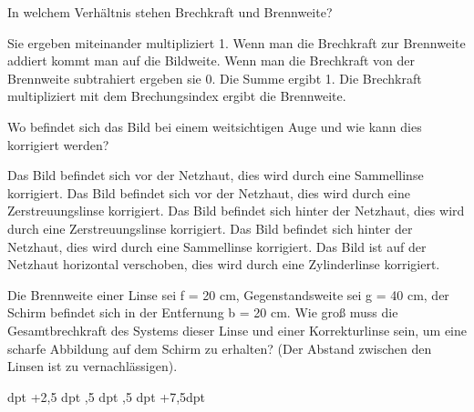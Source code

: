 \documentclass[11pt]{exam}
\begin{document}
\setlength{\voffset}{-0.5in}
\setlength{\headsep}{5pt}

\hspace{2mm}
 \hspace{5mm}
\vspace{4mm}

\begin{questions}

\question In welchem Verhältnis stehen Brechkraft und Brennweite?

\begin{choices}
	\choice Sie ergeben miteinander multipliziert 1.
	\choice Wenn man die Brechkraft zur Brennweite addiert kommt man auf die Bildweite.
	\choice Wenn man die Brechkraft von der Brennweite subtrahiert ergeben sie 0.
	\choice Die Summe ergibt 1.
	\choice Die Brechkraft multipliziert mit dem Brechungsindex ergibt die Brennweite.
\end{choices}

\vspace{3mm}\question Wo befindet sich das Bild bei einem weitsichtigen Auge und wie kann dies korrigiert werden?

\begin{choices}
	\choice Das Bild befindet sich vor der Netzhaut, dies wird durch eine Sammellinse korrigiert.
	\choice Das Bild befindet sich vor der Netzhaut, dies wird durch eine Zerstreuungslinse korrigiert.
	\choice Das Bild befindet sich hinter der Netzhaut, dies wird durch eine Zerstreuungslinse korrigiert.
	\choice Das Bild befindet sich hinter der Netzhaut, dies wird durch eine Sammellinse korrigiert.
	\choice Das Bild ist auf der Netzhaut horizontal verschoben, dies wird durch eine Zylinderlinse korrigiert.
\end{choices}

\vspace{3mm}\question Die Brennweite einer Linse sei f = 20 cm, Gegenstandsweite sei g = 40 cm, der Schirm befindet sich in der Entfernung b = 20 cm. Wie groß muss die Gesamtbrechkraft des Systems dieser Linse und einer Korrekturlinse sein, um eine scharfe Abbildung auf dem Schirm zu erhalten? (Der Abstand zwischen den Linsen ist zu vernachlässigen).

\begin{choices}
	 dpt
	\choice +2,5 dpt
	,5 dpt
	,5 dpt
	\choice +7,5dpt
\end{choices}


\end{questions}
\end{document}
